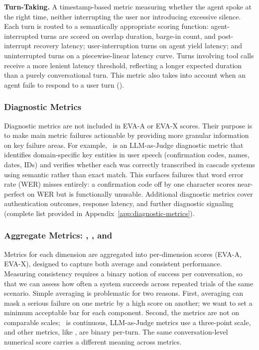 \textbf{Turn-Taking.} A timestamp-based metric measuring whether the agent spoke at the right time, neither interrupting the user nor introducing excessive silence. Each turn is routed to a semantically appropriate scoring function: agent-interrupted turns are scored on overlap duration, barge-in count, and post-interrupt recovery latency; user-interruption turns on agent yield latency; and uninterrupted turns on a piecewise-linear latency curve. Turns involving tool calls receive a more lenient latency threshold, reflecting a longer expected duration than a purely conversational turn. This metric also takes into account when an agent fails to respond to a user turn (\metricconversationcompletion).

\subsubsection{Diagnostic Metrics}

Diagnostic metrics are not included in EVA-A or EVA-X scores. Their purpose is to make main metric failures actionable by providing more granular information on key failure areas. For example, \metrictranscription~is an LLM-as-Judge diagnostic metric that identifies domain-specific key entities in user speech (confirmation codes, names, dates, IDs) and verifies whether each was correctly transcribed in cascade systems using semantic rather than exact match. This surfaces failures that word error rate (WER) misses entirely: a confirmation code off by one character scores near-perfect on WER but is functionally unusable. Additional diagnostic metrics cover authentication outcomes, response latency, and further diagnostic signaling (complete list provided in Appendix~\ref{app:diagnostic-metrics}).


\subsubsection{Aggregate Metrics: \passatone, \passatk, and \passpowerk}

Metrics for each dimension are aggregated into per-dimension scores (EVA-A, EVA-X), designed to capture both average and consistent performance. Measuring consistency requires a binary notion of success per conversation, so that we can assess how often a system succeeds across repeated trials of the same scenario. Simple averaging is problematic for two reasons. First, averaging can mask a serious failure on one metric by a high score on another; we want to set a minimum acceptable bar for each component. Second, the metrics are not on comparable scales; \metricturntaking~is continuous, LLM-as-Judge metrics use a three-point scale, and other metrics, like \metricfidelity, are binary per-turn. The same conversation-level numerical score carries a different meaning across metrics.

